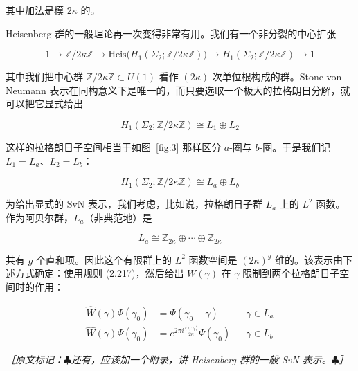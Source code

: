 其中加法是模 $2\kappa$ 的。

Heisenberg 群的一般理论再一次变得非常有用。我们有一个非分裂的中心扩张

\begin{equation}
  1\to\mathbb{Z}/2\kappa\mathbb{Z}\to
  \mathrm{Heis}\big(H_1(\Sigma_2;\mathbb{Z}/2\kappa\mathbb{Z})\big)\to
  H_1(\Sigma_2;\mathbb{Z}/2\kappa\mathbb{Z})\to 1
  \tag{2.219}
  \label{eq:2.219}
\end{equation}

其中我们把中心群 $\mathbb{Z}/2\kappa\mathbb{Z}\subset U(1)$ 看作 $(2\kappa)$ 次单位根构成的群。Stone-von Neumann 表示在同构意义下是唯一的，而只要选取一个极大的拉格朗日分解，就可以把它显式给出

\begin{equation}
  H_1(\Sigma_2;\mathbb{Z}/2\kappa\mathbb{Z})\cong L_1\oplus L_2
  \tag{2.220}
  \label{eq:2.220}
\end{equation}

这样的拉格朗日子空间相当于如图~\ref{fig:3} 那样区分 $a$-圈与 $b$-圈。于是我们记 $L_1=L_a$、$L_2=L_b$：

\begin{equation}
  H_1(\Sigma_2;\mathbb{Z}/2\kappa\mathbb{Z})\cong L_a\oplus L_b
  \tag{2.221}
  \label{eq:2.221}
\end{equation}

为给出显式的 SvN 表示，我们考虑，比如说，拉格朗日子群 $L_a$ 上的 $L^2$ 函数。作为阿贝尔群，$L_a$（非典范地）是

\begin{equation}
  L_a\cong\mathbb{Z}_{2\kappa}\oplus\cdots\oplus\mathbb{Z}_{2\kappa}
  \tag{2.222}
  \label{eq:2.222}
\end{equation}

共有 $g$ 个直和项。因此这个有限群上的 $L^2$ 函数空间是 $(2\kappa)^g$ 维的。该表示由下述方式确定：使用规则 (2.217)，然后给出 $W(\gamma)$ 在 $\gamma$ 限制到两个拉格朗日子空间时的作用：

\begin{equation}
  \begin{aligned}
    \widehat{W}(\gamma)\Psi(\gamma_0)&=\Psi(\gamma_0+\gamma) && \gamma\in L_a\\
    \widehat{W}(\gamma)\Psi(\gamma_0)&=e^{2\pi i\frac{\langle\gamma,\gamma_0\rangle}{2\kappa}}\Psi(\gamma_0)
    && \gamma\in L_b
  \end{aligned}
  \tag{2.223}
  \label{eq:2.223}
\end{equation}

{\small\itshape ［原文标记：$\clubsuit$还有，应该加一个附录，讲 Heisenberg 群的一般 SvN 表示。$\clubsuit$］}

